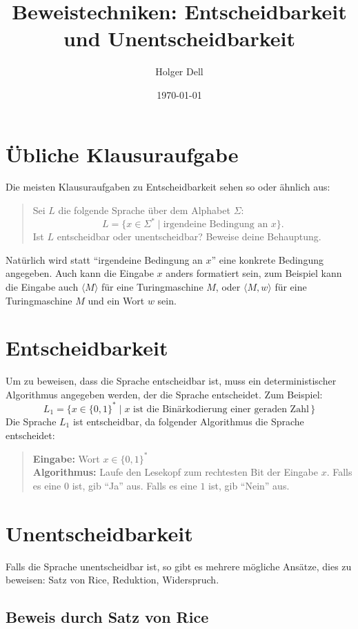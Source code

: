 \documentclass[a4paper,11pt,oneside,ngerman]{scrartcl}
\title{Beweistechniken: Entscheidbarkeit und Unentscheidbarkeit}
\author{%
  Holger Dell%
}
\date{\today}
\begin{document}
\maketitle

\section*{Übliche Klausuraufgabe}
Die meisten Klausuraufgaben zu Entscheidbarkeit sehen so oder ähnlich aus:

\begin{quote}
Sei $L$ die folgende Sprache über dem Alphabet $\Sigma$:
\[
    L = \Big\{x\in\Sigma^\ast \;\big|\; \text{irgendeine Bedingung an $x$}\Big\}.
\]
Ist $L$ entscheidbar oder unentscheidbar? Beweise deine Behauptung.
\end{quote}
Natürlich wird statt \enquote{irgendeine Bedingung an $x$} eine konkrete Bedingung angegeben. Auch kann die Eingabe $x$ anders formatiert sein, zum Beispiel kann die Eingabe auch $\langle M \rangle$ für eine Turingmaschine $M$, oder $\langle M, w\rangle$ für eine Turingmaschine $M$ und ein Wort $w$ sein.

\section{Entscheidbarkeit}
Um zu beweisen, dass die Sprache entscheidbar ist, muss ein deterministischer Algorithmus angegeben werden, der die Sprache entscheidet.
Zum Beispiel:
\[
    L_1 = \Big\{x\in\{0,1\}^\ast \;\big|\; \text{$x$ ist die Binärkodierung einer geraden Zahl}\,\Big\}
\]
Die Sprache $L_1$ ist entscheidbar, da folgender Algorithmus die Sprache entscheidet:
\begin{quote}
\textbf{Eingabe:} Wort $x\in\{0,1\}^\ast$\\
\textbf{Algorithmus:} Laufe den Lesekopf zum rechtesten Bit der Eingabe $x$. Falls es eine $0$ ist, gib \enquote{Ja} aus. Falls es eine $1$ ist, gib \enquote{Nein} aus.
\end{quote}


\section{Unentscheidbarkeit}

Falls die Sprache unentscheidbar ist, so gibt es mehrere mögliche Ansätze, dies zu beweisen: Satz von Rice, Reduktion, Widerspruch.

\subsection{Beweis durch Satz von Rice}
\end{document}
